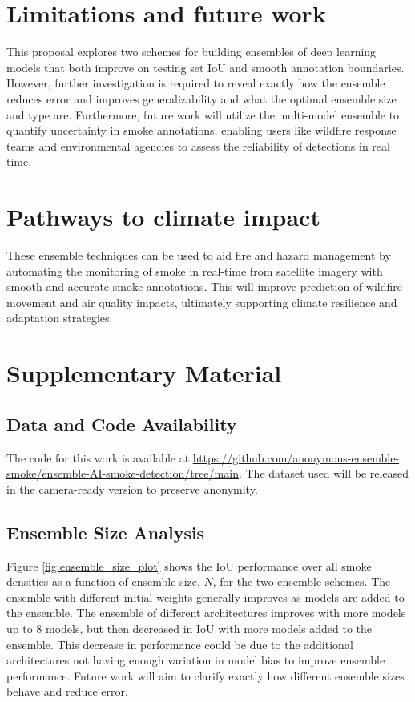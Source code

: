 \documentclass{article}
\begin{document}
\section{Limitations and future work} This proposal explores two schemes for building ensembles of deep learning models that both improve on testing set IoU and smooth annotation boundaries. However, further investigation is required to reveal exactly how the ensemble reduces error and improves generalizability and what the optimal ensemble size and type are. Furthermore, future work will utilize the multi-model ensemble to quantify uncertainty in smoke annotations, enabling users like wildfire response teams and environmental agencies to assess the reliability of detections in real time. 

\section{Pathways to climate impact} These ensemble techniques can be used to aid fire and hazard management by automating the monitoring of smoke in real-time from satellite imagery with smooth and accurate smoke annotations. This will improve prediction of wildfire movement and air quality impacts, ultimately supporting climate resilience and adaptation strategies.  


 

\section{Supplementary Material}
\subsection{Data and Code Availability} The code for this work is available at \url{https://github.com/anonymous-ensemble-smoke/ensemble-AI-smoke-detection/tree/main}. The dataset used will be released in the camera-ready version to preserve anonymity.

\subsection{Ensemble Size Analysis} Figure \ref{fig:ensemble_size_plot} shows the IoU performance over all smoke densities as a function of ensemble size, $N$, for the two ensemble schemes. The ensemble with different initial weights generally improves as models are added to the ensemble. The ensemble of different architectures improves with more models up to 8 models, but then decreased in IoU with more models added to the ensemble. This decrease in performance could be due to the additional architectures not having enough variation in model bias to improve ensemble performance. Future work will aim to clarify exactly how different ensemble sizes behave and reduce error. 
\end{document}
